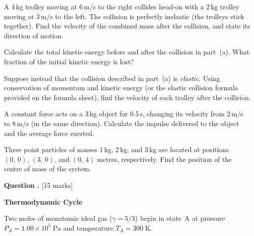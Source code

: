 \documentclass[12pt,a4paper]{article}
\newcounter{questioncounter}
\newcommand{\question}[1]{%
  \stepcounter{questioncounter}%
  \vspace{0.5cm}%
  \noindent\textbf{Question \thequestioncounter.} \hfill [#1 marks]%
  \vspace{0.2cm}%
  \par%
}
\begin{document}
\begin{parts}
\item A 4\,kg trolley moving at 6\,m/s to the right collides head-on with a 2\,kg trolley moving at 3\,m/s to the left. The collision is perfectly inelastic (the trolleys stick together). Find the velocity of the combined mass after the collision, and state its direction of motion. 

\item Calculate the total kinetic energy before and after the collision in part~(a). What fraction of the initial kinetic energy is lost? 

\item Suppose instead that the collision described in part~(a) is \emph{elastic}. Using conservation of momentum and kinetic energy (or the elastic collision formula provided on the formula sheet), find the velocity of each trolley after the collision. 

\item A constant force acts on a 3\,kg object for 0.5\,s, changing its velocity from 2\,m/s to 8\,m/s (in the same direction). Calculate the impulse delivered to the object and the average force exerted. 

\item Three point particles of masses 1\,kg, 2\,kg, and 3\,kg are located at positions $(0,\,0)$, $(3,\,0)$, and $(0,\,4)$ metres, respectively. Find the position of the centre of mass of the system. 
\end{parts}

\newpage

\question{15}

\noindent\textbf{Thermodynamic Cycle}

\noindent Two moles of monatomic ideal gas ($\gamma = 5/3$) begin in state~A at pressure $P_A = 1.00 \times 10^5\;\text{Pa}$ and temperature $T_A = 300\;\text{K}$.
\end{document}
